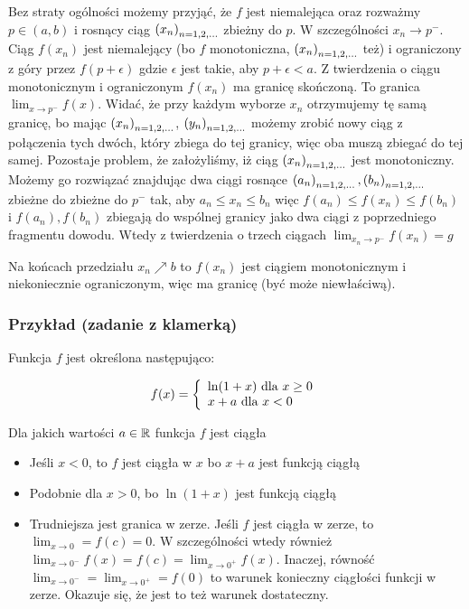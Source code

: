 \documentclass[9pt]{article}
\begin{document}
Bez straty ogólności możemy przyjąć, że $f$ jest niemalejąca oraz rozważmy $p \in (a,b)$ i rosnący
ciąg $\left(x_n\right)_{n = 1,2,...}$ zbieżny do $p$. W szczególności $x_n \to p^-$. Ciąg $f(x_n)$ jest niemalejący (bo
$f$ monotoniczna, $\left(x_n\right)_{n = 1,2,...}$ też) i ograniczony z góry przez $f(p + \epsilon)$ gdzie $\epsilon$
jest takie, aby $p+\epsilon < a$. Z twierdzenia o ciągu monotonicznym i ograniczonym $f(x_n)$ ma
granicę skończoną. To granica $\lim_{x \to p^-} f(x)$. Widać, że przy każdym wyborze $x_n$
otrzymujemy tę samą granicę, bo mając $\left(x_n\right)_{n = 1,2,...}$, $\left(y_n\right)_{n = 1,2,...}$ możemy zrobić nowy ciąg z połączenia
tych dwóch, który zbiega do tej granicy, więc oba muszą zbiegać do tej samej. Pozostaje problem, że
założyliśmy, iż ciąg $\left(x_n\right)_{n = 1,2,...}$ jest monotoniczny. Możemy go rozwiązać znajdując dwa ciągi rosnące
$\left(a_n\right)_{n = 1,2,...}, \left(b_n\right)_{n = 1,2,...}$ zbieżne do zbieżne do $p^-$ tak, aby $a_n \le x_n \le b_n$ więc $f(a_n) \le
f(x_n) \le f(b_n)$ i $f(a_n), f(b_n)$ zbiegają do wspólnej granicy jako dwa ciągi z poprzedniego
fragmentu dowodu. Wtedy z twierdzenia o trzech ciągach $\lim_{x_n \to p^-} f(x_n) = g$

Na końcach przedziału $x_n \nearrow b$ to $f(x_n)$ jest ciągiem monotonicznym i niekoniecznie
ograniczonym, więc ma granicę (być może niewłaściwą).

\subsubsection*{Przykład (zadanie z klamerką)}

Funkcja $f$ jest określona następująco:

\[
    f(x) =
    \left\{
        \begin{array}{l}
            \ln(1+x) \text{ dla } x \ge 0 \\
            x + a \text{ dla } x < 0
        \end{array}
    \right.
\]

Dla jakich wartości $a \in \mathbb{R}$ funkcja $f$ jest ciągła

\begin{itemize}
    \item Jeśli $x < 0$, to $f$ jest ciągła w $x$ bo $x+a$ jest funkcją ciągłą
    \item Podobnie dla $x > 0$, bo $\ln(1+x)$ jest funkcją ciągłą
    \item Trudniejsza jest granica w zerze. Jeśli $f$ jest ciągła w zerze, to
        $\lim_{x \to 0} = f(c) = 0$.
        W szczególności wtedy również
        $\lim_{x \to 0^-} f(x) = f(c) = \lim_{x \to 0^+} f(x)$.
        Inaczej, równość
        $\lim_{x \to 0^-} = \lim_{x \to 0^+} = f(0)$
        to warunek konieczny ciągłości funkcji w zerze. Okazuje się, że jest to też warunek
        dostateczny.
\end{itemize}
\end{document}
